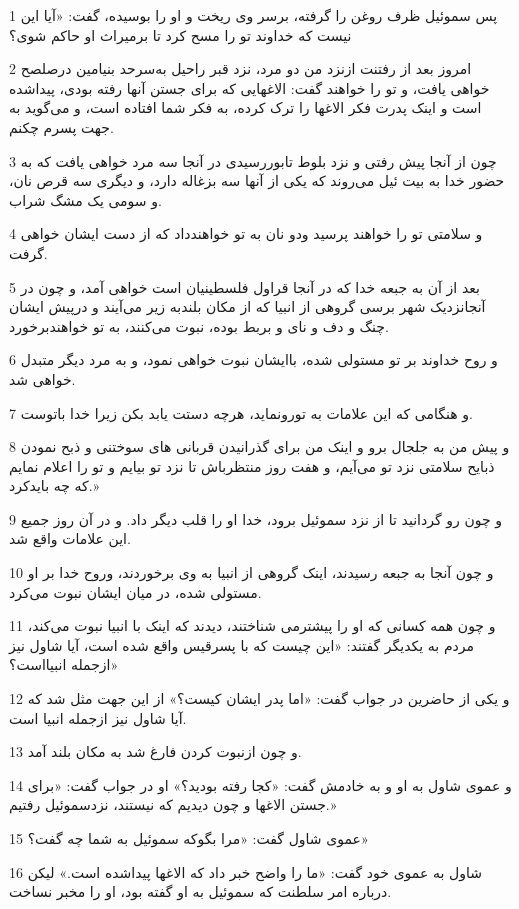 \par 1 پس سموئیل ظرف روغن را گرفته، برسر وی ریخت و او را بوسیده، گفت: «آیا این نیست که خداوند تو را مسح کرد تا برمیراث او حاکم شوی؟
\par 2 امروز بعد از رفتنت ازنزد من دو مرد، نزد قبر راحیل به‌سرحد بنیامین درصلصح خواهی یافت، و تو را خواهند گفت: الاغهایی که برای جستن آنها رفته بودی، پیداشده است و اینک پدرت فکر الاغها را ترک کرده، به فکر شما افتاده است، و می‌گوید به جهت پسرم چکنم.
\par 3 چون از آنجا پیش رفتی و نزد بلوط تابوررسیدی در آنجا سه مرد خواهی یافت که به حضور خدا به بیت ئیل می‌روند که یکی از آنها سه بزغاله دارد، و دیگری سه قرص نان، و سومی یک مشگ شراب.
\par 4 و سلامتی تو را خواهند پرسید ودو نان به تو خواهندداد که از دست ایشان خواهی گرفت.
\par 5 بعد از آن به جبعه خدا که در آنجا قراول فلسطینیان است خواهی آمد، و چون در آنجانزدیک شهر برسی گروهی از انبیا که از مکان بلندبه زیر می‌آیند و در‌پیش ایشان چنگ و دف و نای و بربط بوده، نبوت می‌کنند، به تو خواهندبرخورد.
\par 6 و روح خداوند بر تو مستولی شده، باایشان نبوت خواهی نمود، و به مرد دیگر متبدل خواهی شد.
\par 7 و هنگامی که این علامات به تورونماید، هرچه دستت یابد بکن زیرا خدا باتوست.
\par 8 و پیش من به جلجال برو و اینک من برای گذرانیدن قربانی های سوختنی و ذبح نمودن ذبایح سلامتی نزد تو می‌آیم، و هفت روز منتظرباش تا نزد تو بیایم و تو را اعلام نمایم که چه بایدکرد.»
\par 9 و چون رو گردانید تا از نزد سموئیل برود، خدا او را قلب دیگر داد. و در آن روز جمیع این علامات واقع شد.
\par 10 و چون آنجا به جبعه رسیدند، اینک گروهی از انبیا به وی برخوردند، وروح خدا بر او مستولی شده، در میان ایشان نبوت می‌کرد.
\par 11 و چون همه کسانی که او را پیشترمی شناختند، دیدند که اینک با انبیا نبوت می‌کند، مردم به یکدیگر گفتند: «این چیست که با پسرقیس واقع شده است، آیا شاول نیز از‌جمله انبیااست؟»
\par 12 و یکی از حاضرین در جواب گفت: «اما پدر ایشان کیست؟» از این جهت مثل شد که آیا شاول نیز از‌جمله انبیا است. 
\par 13 و چون ازنبوت کردن فارغ شد به مکان بلند آمد.
\par 14 و عموی شاول به او و به خادمش گفت: «کجا رفته بودید؟» او در جواب گفت: «برای جستن الاغها و چون دیدیم که نیستند، نزدسموئیل رفتیم.»
\par 15 عموی شاول گفت: «مرا بگوکه سموئیل به شما چه گفت؟»
\par 16 شاول به عموی خود گفت: «ما را واضح خبر داد که الاغها پیداشده است.» لیکن درباره امر سلطنت که سموئیل به او گفته بود، او را مخبر نساخت.
